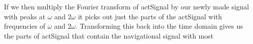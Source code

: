 \documentclass[12pt]{article}
\begin{document}
If we then multiply the Fourier transform of actSignal by our newly made signal with peaks at $\omega$ and $2\omega$ it picks out just the parts of the actSignal with frequencies of $\omega$ and $2\omega$. Transforming this back into the time domain gives us the parts of actSignal that contain the navigational signal with most 













{}

\end{document}

